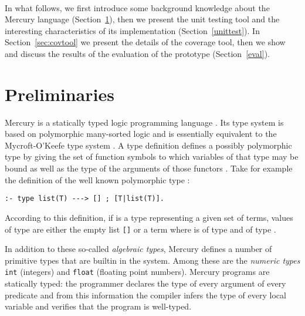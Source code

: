 \documentclass[british]{llncs}
\begin{document}
\paragraph*{}
In what follows, we first introduce some background knowledge about the Mercury language (Section~\ref{prelim}), then we present the unit testing tool and the interesting characteristics of its implementation (Section~\ref{unittest}). In Section~\ref{sec:covtool} we present the details of the coverage tool, then we show and discuss the results of the evaluation of the prototype (Section~\ref{eval}).

\section{Preliminaries}\label{prelim}

Mercury is a statically typed logic programming language \cite{mercury:jlp}.
Its type system is based on polymorphic many-sorted logic and is essentially
equivalent to the Mycroft-O'Keefe type system \cite{mycroft:typesprolog}.
A type definition defines a possibly polymorphic type by giving the
set of function symbols to which variables of that type may be bound
as well as the type of the arguments of those functors \cite{mercury:jlp}.
Take for example the definition of the well known polymorphic type
:


\begin{lstlisting}[basicstyle={\ttfamily},breaklines=true,tabsize=4]
:- type list(T) ---> [] ; [T|list(T)].
\end{lstlisting}


\noindent According to this definition, if  is a type representing
a given set of terms, values of type  are either the empty
list \texttt{{[}{]}} or a term  where  is
of type  and  of type .

In addition to these so-called \emph{algebraic types}, Mercury defines
a number of primitive types that are builtin in the system. Among
these are the \emph{numeric types} \texttt{int} (integers) and \texttt{float}
(floating point numbers). Mercury programs are statically typed: the
programmer declares the type of every argument of every predicate
and from this information the compiler infers the type of every local
variable and verifies that the program is well-typed.
\end{document}
